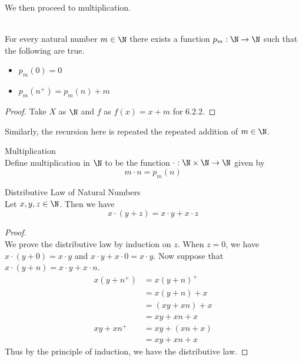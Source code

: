 \documentclass[a4paper]{article}
\begin{document}
We then proceed to multiplication. 

\begin{prp}{}{}\\
For every natural number $m\in\N$ there exists a function $p_m:\N\to\N$ such that the following are true. 
\begin{itemize}
\item $p_m(0)=0$
\item $p_m(n^+)=p_m(n)+m$
\end{itemize}
\begin{proof}
Take $X$ as $\N$ and $f$ as $f(x)=x+m$ for 6.2.2. 
\end{proof}
\end{prp}

Similarly, the recursion here is repeated the repeated addition of $m\in\N$. 

\begin{defn}{Multiplication}{}\\
Define multiplication in $\N$ to be the function $\cdot:\N\times\N\to\N$ given by $$m\cdot n=p_m(n)$$
\end{defn}

\begin{prp}{Distributive Law of Natural Numbers}{}\\
Let $x,y,z\in\N$. Then we have $$x\cdot(y+z)=x\cdot y+x\cdot z$$
\begin{proof}\\
We prove the distributive law by induction on $z$. When $z=0$, we have $x\cdot(y+0)=x\cdot y$ and $x\cdot y+x\cdot 0=x\cdot y$. Now suppose that $x\cdot(y+n)=x\cdot y+x\cdot n$. 
\begin{align*}
x(y+n^+)&=x(y+n)^+ \tag{Definition of Addition}\\
&=x(y+n)+x \tag{Definition of Multiplication}\\
&=(xy+xn)+x \tag{Induction Hypothesis}\\
&=xy+xn+x \tag{Associativity of Addition}\\
xy+xn^+&=xy+(xn+x) \tag{Definition of Multiplication}\\
&=xy+xn+x \tag{Associativity of Addition}
\end{align*}
Thus by the principle of induction, we have the distributive law. 
\end{proof}
\end{prp}
\end{document}
